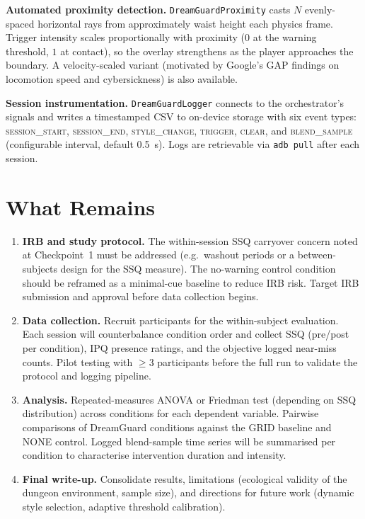 \documentclass{styling/vgtc}                          %
\begin{document}
\textbf{Automated proximity detection.}
\texttt{DreamGuardProximity} casts $N$ evenly-spaced horizontal rays from
approximately waist height each physics frame. Trigger intensity scales
proportionally with proximity ($0$ at the warning threshold, $1$ at contact),
so the overlay strengthens as the player approaches the boundary.
A velocity-scaled variant (motivated by Google's GAP findings on locomotion
speed and cybersickness) is also available.

\textbf{Session instrumentation.}
\texttt{DreamGuardLogger} connects to the orchestrator's signals and writes a
timestamped CSV to on-device storage with six event types:
\textsc{session\_start}, \textsc{session\_end}, \textsc{style\_change},
\textsc{trigger}, \textsc{clear}, and \textsc{blend\_sample} (configurable
interval, default 0.5~s). Logs are retrievable via \texttt{adb pull} after
each session.

\section*{What Remains}

\begin{enumerate}
  \item \textbf{IRB and study protocol.} The within-session SSQ carryover
    concern noted at Checkpoint~1 must be addressed (e.g.\ washout periods or
    a between-subjects design for the SSQ measure). The no-warning control
    condition should be reframed as a minimal-cue baseline to reduce IRB risk.
    Target IRB submission and approval before data collection begins.

  \item \textbf{Data collection.} Recruit participants for the within-subject
    evaluation. Each session will counterbalance condition order and collect
    SSQ (pre/post per condition), IPQ presence ratings, and the objective
    logged near-miss counts. Pilot testing with $\ge 3$ participants before
    the full run to validate the protocol and logging pipeline.

  \item \textbf{Analysis.} Repeated-measures ANOVA or Friedman test (depending
    on SSQ distribution) across conditions for each dependent variable.
    Pairwise comparisons of DreamGuard conditions against the GRID baseline
    and NONE control. Logged blend-sample time series will be summarised per
    condition to characterise intervention duration and intensity.

  \item \textbf{Final write-up.} Consolidate results, limitations (ecological
    validity of the dungeon environment, sample size), and directions for
    future work (dynamic style selection, adaptive threshold calibration).
\end{enumerate}
\end{document}
